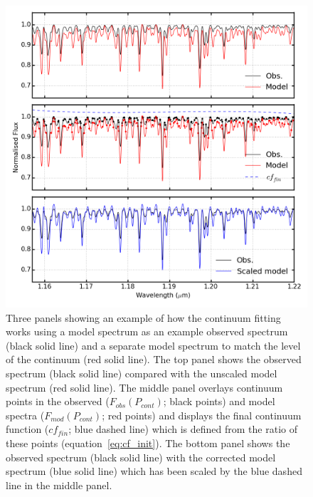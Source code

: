 \begin{figure}
 \centering
\includegraphics[width=\textwidth]{JAnal/cw-3panels}
\caption[Continuum fitting procedure]{
Three panels showing an example of how the continuum fitting works using a model spectrum as an example observed spectrum (black solid line) and a separate model spectrum to match the level of the continuum (red solid line).
The top panel shows the observed spectrum (black solid line) compared with the unscaled model spectrum (red solid line).
The middle panel overlays continuum points in the observed ($F_{obs}(P_{cont})$; black points) and model spectra ($F_{mod}(P_{cont})$; red points) and displays the final continuum function ($cf_{fin}$; blue dashed line) which is defined from the ratio of these points (equation~\ref{eq:cf_init}).
The bottom panel shows the observed spectrum (black solid line) with the corrected model spectrum (blue solid line) which has been scaled by the blue dashed line in the middle panel.
\label{fig:cft3pan}}
\end{figure}


